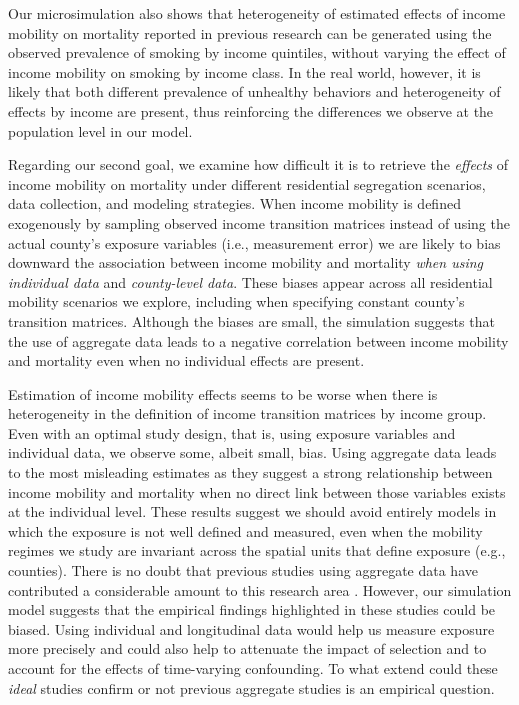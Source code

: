 \documentclass[class=article, crop=false, 12pt]{standalone}
\begin{document}
Our microsimulation also shows that heterogeneity of estimated effects of income mobility on mortality reported in previous research \citep{venkataramani2020} can be generated using the observed prevalence of smoking by income quintiles, without varying the effect of income mobility on smoking by income class. In the real world, however, it is likely that both different prevalence of unhealthy behaviors and heterogeneity of effects by income are present, thus reinforcing the differences we observe at the population level in our model. 

Regarding our second goal, we examine how difficult it is to retrieve the \textit{effects} of income mobility on mortality under different residential segregation scenarios, data collection, and modeling strategies. When income mobility is defined exogenously by sampling observed income transition matrices \citep{chetty2014} instead of using the actual county's exposure variables (i.e., measurement error) we are likely to bias downward the association between income mobility and mortality \emph{when using individual data} and \emph{ county-level data}. These biases appear across all residential mobility scenarios we explore, including when specifying constant county's transition matrices. Although the biases are small, the simulation suggests that the use of aggregate data leads to a negative correlation between income mobility and mortality even when no individual effects are present.

Estimation of income mobility effects seems to be worse when there is heterogeneity in the definition of income transition matrices by income group. Even with an optimal study design, that is, using exposure variables and individual data, we observe some, albeit small, bias. Using aggregate data leads to the most misleading estimates as they suggest a strong relationship between income mobility and mortality when no direct link between those variables exists at the individual level. These results suggest we should avoid entirely models in which the exposure is not well defined and measured, even when the mobility regimes we study are invariant across the spatial units that define exposure (e.g., counties). There is no doubt that previous studies using aggregate data have contributed a considerable amount to this research area \citep{venkataramani2015, daza2018a, venkataramani2020}. However, our simulation model suggests that the empirical findings highlighted in these studies could be biased. Using individual and longitudinal data would help us measure exposure more precisely and could also help to attenuate the impact of selection and to account for the effects of time-varying confounding. To what extend could these \textit{ideal} studies confirm or not previous aggregate studies is an empirical question. 
\end{document}
